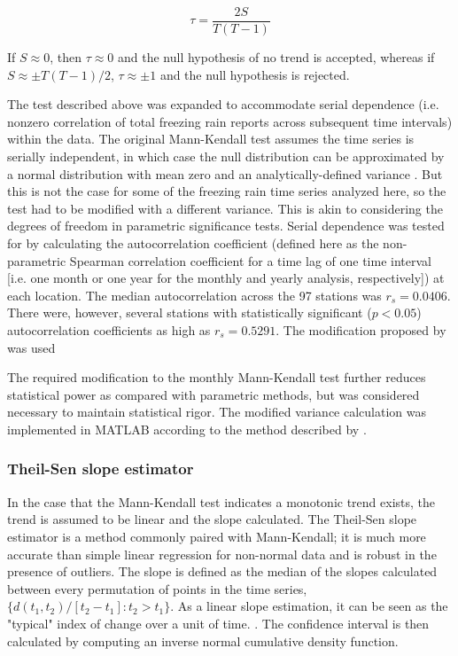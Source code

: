 \documentclass[twocol]{ametsoc}
\begin{document}
\[\tau=\frac{2S}{T(T-1)}\]

If $S\approx0$, then $\tau\approx0$ and the null hypothesis of no trend is accepted, whereas if  $S\approx\pm T(T-1)/2$, $\tau\approx\pm1$ and the null hypothesis is rejected. 

The test described above was expanded to accommodate serial dependence (i.e. nonzero correlation of total freezing rain reports across subsequent time intervals) within the data. The original Mann-Kendall test assumes the time series is serially independent, in which case the null distribution can be approximated by a normal distribution with mean zero and an analytically-defined variance \citep{kendall1955rank}. But this is not the case for some of the freezing rain time series analyzed here, so the test had to be modified with a different variance. This is akin to considering the degrees of freedom in parametric significance tests. Serial dependence was tested for by calculating the autocorrelation coefficient (defined here as the non-parametric Spearman correlation coefficient for a time lag of one time interval [i.e. one month or one year for the monthly and yearly analysis, respectively]) at each location. The median autocorrelation across the 97 stations was $r_s = 0.0406$. There were, however, several stations with statistically significant ($p<0.05$) autocorrelation coefficients as high as $r_s = 0.5291$. The modification proposed by \citet{hamed1998modified} was used

The required modification to the monthly Mann-Kendall test further reduces statistical power as compared with parametric methods, but was considered necessary to maintain statistical rigor. The modified variance calculation was implemented in MATLAB according to the method described by \citet{hirsch1984nonparametric}. 

\subsubsection{Theil-Sen slope estimator}
In the case that the Mann-Kendall test indicates a monotonic trend exists, the trend is assumed to be linear and the slope calculated. The Theil-Sen slope estimator is a method commonly paired with Mann-Kendall; it is much more accurate than simple linear regression for non-normal data and is robust in the presence of outliers. The slope is defined as the median of the slopes calculated between every permutation of points in the time series, $\{d(t_1,t_2)/[t_2-t_1]:t_2>t_1\}$. As a linear slope estimation, it can be seen as the "typical" index of change over a unit of time. \citep{chandler2011statistical}. The confidence interval is then calculated by computing an inverse normal cumulative density function.
\end{document}
